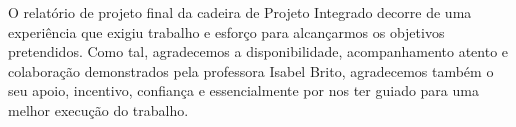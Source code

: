 \agradecimentos

O relatório de projeto final da cadeira de Projeto Integrado decorre de uma experiência que exigiu trabalho e esforço para alcançarmos os objetivos pretendidos. Como tal, agradecemos a disponibilidade, acompanhamento atento e
colaboração demonstrados pela professora Isabel Brito, agradecemos também o seu apoio, incentivo, confiança e essencialmente por nos ter guiado para uma melhor execução do trabalho.


